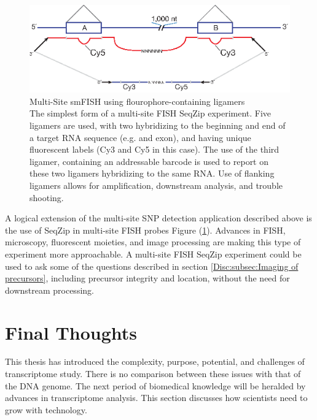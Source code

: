       \begin{figure} %
        \centering 
        \includegraphics{Figures/Discussion/MultiSiteFish.eps}
        \caption[Multi-Site smFISH using flourophore-containing ligamers]
        {
          Multi-Site smFISH using flourophore-containing ligamers
          \\ [0.25cm]
          The simplest form of a multi-site FISH SeqZip experiment. Five ligamers are used, with two hybridizing to the beginning and end of a target RNA sequence (e.g. and exon), and having unique fluorescent labels (Cy3 and Cy5 in this case). The use of the third ligamer, containing an addressable barcode is used to report on these two ligamers hybridizing to the same RNA. Use of flanking ligamers allows for amplification, downstream analysis, and trouble shooting.
          }
        \label{Disc:fig:MultiSite FISH using SeqZip}
        \end{figure}

      A logical extension of the multi-site SNP detection application described above is the use of SeqZip in multi-site FISH probes Figure (\ref{Disc:fig:MultiSite FISH using SeqZip}). Advances in FISH, microscopy, fluorescent moieties, and image processing are making this type of experiment more approachable. A multi-site FISH SeqZip experiment could be used to ask some of the questions described in section \ref{Disc:subsec:Imaging of precursors}, including precursor integrity and location, without the need for downstream processing.

\section{Final Thoughts}
  \label{Disc:sec:Final Thoughts}

  This thesis has introduced the complexity, purpose, potential, and challenges of transcriptome study. There is no comparison between these issues with that of the DNA genome. The next period of biomedical knowledge will be heralded by advances in transcriptome analysis. This section discusses how scientists need to grow with technology.

